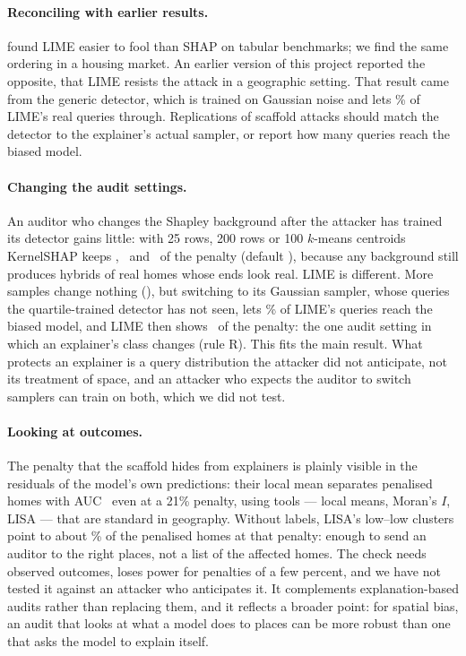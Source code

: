 \paragraph{Reconciling with earlier results.} \citet{slack2020fooling} found LIME easier to fool than SHAP on
tabular benchmarks; we find the same ordering in a housing market. An earlier version of this project reported the
opposite, that LIME resists the attack in a geographic setting. That result came from the generic detector, which is
trained on Gaussian noise and lets \FLIMEGenLeak\% of LIME's real queries through. Replications of scaffold attacks
should match the detector to the explainer's actual sampler, or report how many queries reach the biased model.

\paragraph{Changing the audit settings.}\label{sec:discussion-audit}
An auditor who changes the Shapley background after the attacker has trained its detector gains little: with 25 rows,
200 rows or 100 $k$-means centroids KernelSHAP keeps \RobBackgroundCFrowsKernelSHAPKept, \RobBackgroundCAArowsKernelSHAPKept\
and \RobkmeansbackgroundKernelSHAPKept\ of the penalty (default \RobMainXGBoostdefaultKernelSHAPKept), because any
background still produces hybrids of real homes whose ends look real. LIME is different. More samples change nothing
(\RobLIMEFAAAsamplesLIMEKept), but switching to its Gaussian sampler, whose queries the quartile-trained detector has not
seen, lets \RobLIMEGaussiansampleLIMELeak\% of LIME's queries reach the biased model, and LIME then shows
\RobLIMEGaussiansampleLIMEKept\ of the penalty: the one audit setting in which an explainer's class changes (rule R).
This fits the main result. What protects an explainer is a query distribution the attacker did not anticipate, not
its treatment of space, and an attacker who expects the auditor to switch samplers can train on both, which we did not
test.

\paragraph{Looking at outcomes.} The penalty that the scaffold hides from explainers is plainly visible in the
residuals of the model's own predictions: their local mean separates penalised homes with AUC
\EsevenAucLagScaffoldTen\ even at a 21\% penalty, using tools --- local means, Moran's $I$, LISA --- that are standard
in geography. Without labels, LISA's low--low clusters point to about \EsevenRecallTen\% of the penalised homes at that
penalty: enough to send an auditor to the right places, not a list of the affected homes. The check needs observed
outcomes, loses power for penalties of a few percent, and we have not tested it against an attacker who anticipates
it. It complements explanation-based audits rather than replacing them, and it
reflects a broader point: for spatial bias, an audit that looks at what a model does to places can be more robust than
one that asks the model to explain itself.
